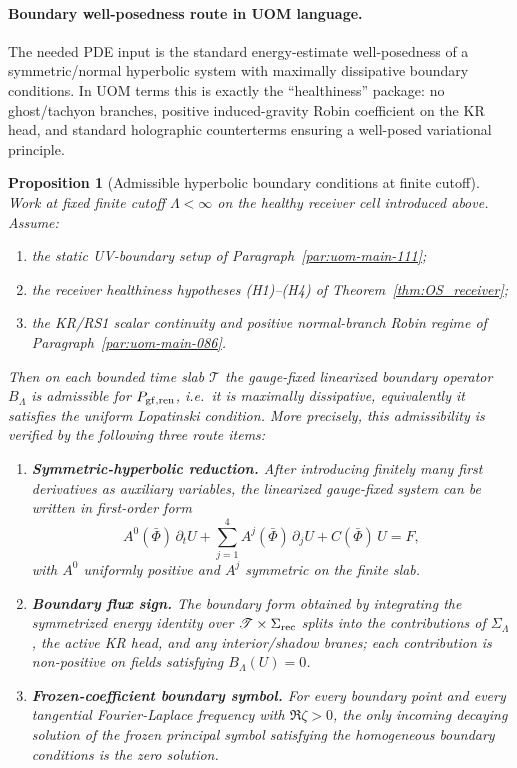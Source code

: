 \documentclass[10pt]{article}
\theoremstyle{definition}
\theoremstyle{plain}
\newtheorem{proposition}{Proposition}[section]
\begin{document}
\paragraph{Boundary well-posedness route in UOM language.}
The needed PDE input is the standard energy-estimate well-posedness of a symmetric/normal hyperbolic system with maximally dissipative
boundary conditions.  In UOM terms this is exactly the ``healthiness'' package: no ghost/tachyon branches, positive induced-gravity
Robin coefficient on the KR head, and standard holographic counterterms ensuring a well-posed variational principle.

\begin{proposition}[Admissible hyperbolic boundary conditions at finite cutoff]
\label{prop:uom-admissible-BC-route}
Work at fixed finite cutoff $\Lambda<\infty$ on the healthy receiver cell introduced above.
Assume:
\begin{enumerate}[label=\textnormal{(\roman*)},leftmargin=2.2em,itemsep=1pt]
\item the static UV-boundary setup of Paragraph~\ref{par:uom-main-111};
\item the receiver healthiness hypotheses \textnormal{(H1)}--\textnormal{(H4)} of
Theorem~\ref{thm:OS_receiver};
\item the KR/RS1 scalar continuity and positive normal-branch Robin regime of
Paragraph~\ref{par:uom-main-086}.
\end{enumerate}
Then on each bounded time slab $\mathscr T$ the gauge-fixed linearized boundary operator $B_\Lambda$ is admissible for
$P_{\rm gf,ren}$, i.e.\ it is maximally dissipative, equivalently it satisfies the uniform Lopatinski condition.
More precisely, this admissibility is verified by the following three route items:
\begin{enumerate}[label=\textnormal{(R\arabic*)},leftmargin=2.4em,itemsep=1pt]
\item \textbf{Symmetric-hyperbolic reduction.}
After introducing finitely many first derivatives as auxiliary variables, the linearized gauge-fixed system can be written in first-order form
\[
A^0(\bar\Phi)\,\partial_t U + \sum_{j=1}^{4} A^j(\bar\Phi)\,\partial_j U + C(\bar\Phi)\,U = F,
\]
with $A^0$ uniformly positive and $A^j$ symmetric on the finite slab.
\item \textbf{Boundary flux sign.}
The boundary form obtained by integrating the symmetrized energy identity over $\mathscr T\times\Sigma_{\rm rec}$ splits into the
contributions of $\Sigma_\Lambda$, the active KR head, and any interior/shadow branes; each contribution is non-positive on fields satisfying
$B_\Lambda(U)=0$.
\item \textbf{Frozen-coefficient boundary symbol.}
For every boundary point and every tangential Fourier-Laplace frequency with $\Re \zeta>0$, the only incoming decaying solution of the frozen
principal symbol satisfying the homogeneous boundary conditions is the zero solution.
\end{enumerate}
\end{proposition}
\end{document}
